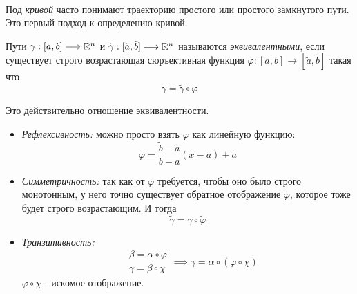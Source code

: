 \documentclass[../main.tex]{subfiles}
\begin{document}
~

Под \emph{кривой} часто понимают траекторию простого или простого замкнутого пути. Это первый подход к определению кривой.

Пути \( \gamma : \left[ a,b\right] \longrightarrow \mathbb{R} ^n\) и \( \tilde{ \gamma }: [ \tilde{a}, \tilde{b}] \longrightarrow \mathbb{R} ^n\) называются 
\emph{эквивалентными}, если существует строго возрастающая сюръективная функция \( \varphi :\left[ a,b\right] \longrightarrow [ \tilde{a}, \tilde{b}]\) такая что 
\[ \gamma = \tilde{ \gamma } \circ \varphi \]

\begin{note}
    Это действительно отношение эквивалентности.
    \begin{itemize}
        \item \emph{Рефлексивность:} можно просто взять \( \varphi \) как линейную функцию:
        \[ \varphi = \dfrac{ \tilde{b}-\tilde{a}}{ b-a}\left( x-a\right)+ \tilde{a}\]
        \item \emph{Симметричность:} так как от \( \varphi \) требуется, чтобы оно было строго монотонным, у него точно существует обратное отображение \( \tilde{ \varphi }\), которое тоже будет строго возрастающим. И тогда 
        \[ \tilde{ \gamma }= \gamma \circ \tilde{ \varphi }\]
        \item \emph{Транзитивность:}
        \begin{equation*}
            \begin{aligned}
                &\beta = \alpha \circ \varphi\\
                &\gamma = \beta \circ \chi
            \end{aligned}
            \implies \gamma = \alpha \circ \left( \varphi \circ \chi\right)
        \end{equation*}
        \( \varphi \circ \chi \) - искомое отображение. 
    \end{itemize}
\end{note}
\end{document}
